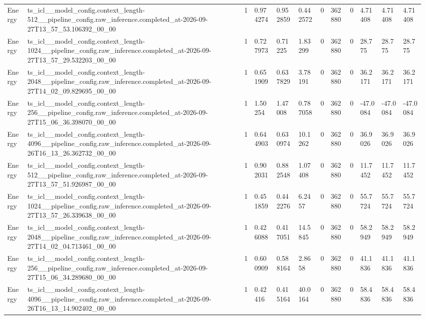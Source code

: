 \begin{tabular}{llllllllllll}
Energy & ts\_icl\_\_model\_config.context\_length-512\_\_pipeline\_config.raw\_inference.completed\_at-2026-09-27T13\_57\_53.106392\_00\_00 & 1 & 0.974274 & 0.952859 & 0.442572 & 0 & 362880 & 0 & 4.71408 & 4.71408 & 4.71408 \\
Energy & ts\_icl\_\_model\_config.context\_length-1024\_\_pipeline\_config.raw\_inference.completed\_at-2026-09-27T13\_57\_29.532203\_00\_00 & 1 & 0.727973 & 0.71225 & 1.83299 & 0 & 362880 & 0 & 28.775 & 28.775 & 28.775 \\
Energy & ts\_icl\_\_model\_config.context\_length-2048\_\_pipeline\_config.raw\_inference.completed\_at-2026-09-27T14\_02\_09.829695\_00\_00 & 1 & 0.651909 & 0.637829 & 3.78191 & 0 & 362880 & 0 & 36.2171 & 36.2171 & 36.2171 \\
Energy & ts\_icl\_\_model\_config.context\_length-256\_\_pipeline\_config.raw\_inference.completed\_at-2026-09-27T15\_06\_36.398070\_00\_00 & 1 & 1.50254 & 1.47008 & 0.787058 & 0 & 362880 & 0 & -47.0084 & -47.0084 & -47.0084 \\
Energy & ts\_icl\_\_model\_config.context\_length-4096\_\_pipeline\_config.raw\_inference.completed\_at-2026-09-26T16\_13\_26.362732\_00\_00 & 1 & 0.644903 & 0.630974 & 10.1262 & 0 & 362880 & 0 & 36.9026 & 36.9026 & 36.9026 \\
Energy & ts\_icl\_\_model\_config.context\_length-512\_\_pipeline\_config.raw\_inference.completed\_at-2026-09-27T13\_57\_51.926987\_00\_00 & 1 & 0.902031 & 0.882548 & 1.07408 & 0 & 362880 & 0 & 11.7452 & 11.7452 & 11.7452 \\
Energy & ts\_icl\_\_model\_config.context\_length-1024\_\_pipeline\_config.raw\_inference.completed\_at-2026-09-27T13\_57\_26.339638\_00\_00 & 1 & 0.451859 & 0.442276 & 6.2457 & 0 & 362880 & 0 & 55.7724 & 55.7724 & 55.7724 \\
Energy & ts\_icl\_\_model\_config.context\_length-2048\_\_pipeline\_config.raw\_inference.completed\_at-2026-09-27T14\_02\_04.713461\_00\_00 & 1 & 0.426088 & 0.417051 & 14.5845 & 0 & 362880 & 0 & 58.2949 & 58.2949 & 58.2949 \\
Energy & ts\_icl\_\_model\_config.context\_length-256\_\_pipeline\_config.raw\_inference.completed\_at-2026-09-27T15\_06\_34.289680\_00\_00 & 1 & 0.600909 & 0.588164 & 2.8658 & 0 & 362880 & 0 & 41.1836 & 41.1836 & 41.1836 \\
Energy & ts\_icl\_\_model\_config.context\_length-4096\_\_pipeline\_config.raw\_inference.completed\_at-2026-09-26T16\_13\_14.902402\_00\_00 & 1 & 0.42416 & 0.415164 & 40.0164 & 0 & 362880 & 0 & 58.4836 & 58.4836 & 58.4836 \\

\end{tabular}
